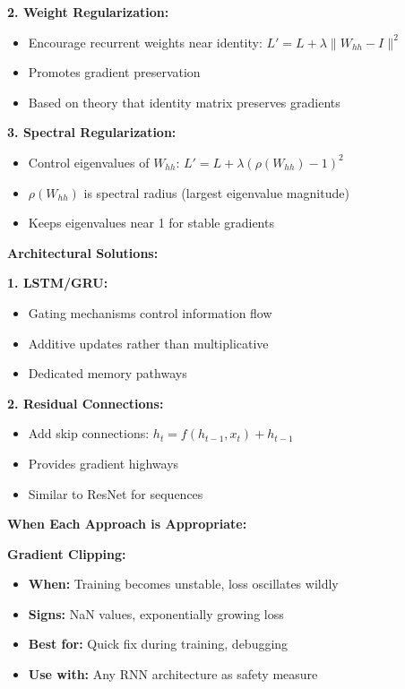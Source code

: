 \documentclass[12pt]{article}
\begin{document}
\begin{enumerate}[(a)]
{    \textbf{2. Weight Regularization:}
    \begin{itemize}
        \item Encourage recurrent weights near identity: $L' = L + \lambda \|W_{hh} - I\|^2$
        \item Promotes gradient preservation
        \item Based on theory that identity matrix preserves gradients
    \end{itemize}
    
    \textbf{3. Spectral Regularization:}
    \begin{itemize}
        \item Control eigenvalues of $W_{hh}$: $L' = L + \lambda (\rho(W_{hh}) - 1)^2$
        \item $\rho(W_{hh})$ is spectral radius (largest eigenvalue magnitude)
        \item Keeps eigenvalues near 1 for stable gradients
    \end{itemize}
    
    \textbf{Architectural Solutions:}
    
    \textbf{1. LSTM/GRU:}
    \begin{itemize}
        \item Gating mechanisms control information flow
        \item Additive updates rather than multiplicative
        \item Dedicated memory pathways
    \end{itemize}
    
    \textbf{2. Residual Connections:}
    \begin{itemize}
        \item Add skip connections: $h_t = f(h_{t-1}, x_t) + h_{t-1}$
        \item Provides gradient highways
        \item Similar to ResNet for sequences
    \end{itemize}
    
    \textbf{When Each Approach is Appropriate:}
    
    \textbf{Gradient Clipping:}
    \begin{itemize}
        \item \textbf{When:} Training becomes unstable, loss oscillates wildly
        \item \textbf{Signs:} NaN values, exponentially growing loss
        \item \textbf{Best for:} Quick fix during training, debugging
        \item \textbf{Use with:} Any RNN architecture as safety measure
    \end{itemize}
    
}
\end{enumerate}
\end{document}
